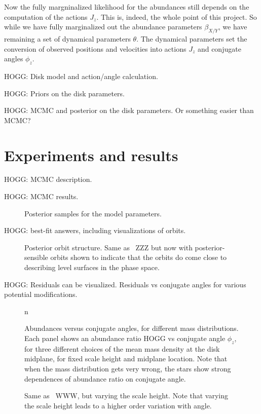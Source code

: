 \documentclass[modern]{aastex63}
\begin{document}
Now the fully margninalized likelihood for the abundances still depends on the computation
of the actions $J_z$. This is, indeed, the whole point of this project.
So while we have fully marginalized out the abundance parameters $\beta_{X/Y}$, we have
remaining a set of dynamical parameters $\theta$.
The dynamical parameters set the conversion of observed positions and velocities into actions $J_z$
and conjugate angles $\phi_z$.

HOGG: Disk model and action/angle calculation.

HOGG: Priors on the disk parameters.

HOGG: MCMC and posterior on the disk parameters. Or something easier than MCMC?

\section{Experiments and results}

HOGG: MCMC description.

HOGG: MCMC results.
\begin{figure}
\caption{Posterior samples for the model parameters.\label{fig:samples}}
\end{figure}

HOGG: best-fit answers, including visualizations of orbits.
\begin{figure}
\caption{Posterior orbit structure. Same as \figurename~ZZZ but now with
posterior-sensible orbits shown to indicate that the orbits do come close to describing
level surfaces in the phase space.\label{fig:orbits}}
\end{figure}

HOGG: Residuals can be visualized. Residuals vs conjugate angles for various potential modifications.

\begin{figure}
n\caption{Abundances versus conjugate angles, for different mass distributions.
Each panel shows an abundance ratio HOGG vs conjugate angle $\phi_z$, for three different
choices of the mean mass density at the disk midplane, for fixed scale height and midplane
location. Note that when the mass distribution gets very wrong, the stars show strong
dependences of abundance ratio on conjugate angle.\label{fig:density}}
\end{figure}

\begin{figure}
\caption{Same as \figurename~WWW, but varying the scale height. Note that
varying the scale height leads to a higher order variation with angle.\label{fig:scaleheight}}
\end{figure}
\end{document}
